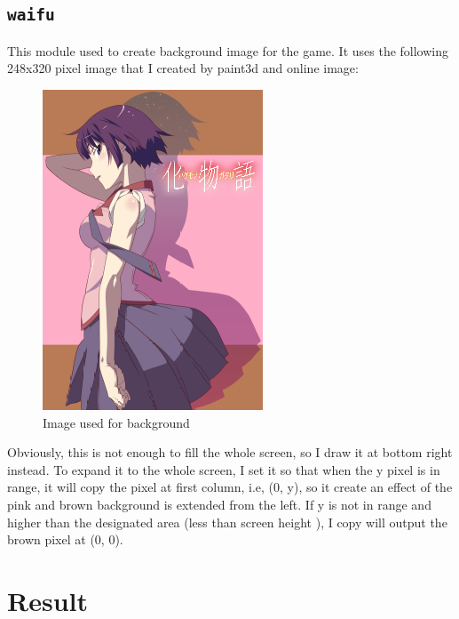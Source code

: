 \documentclass[scale = 0.9]{article}
\let\oldsection\section
\renewcommand\section{\clearpage\oldsection}
\newcommand{\code}[1]{\colorbox{light-gray}{\texttt{#1}}} %
\begin{document}
\subsection{\code{waifu}}
This module used to create background image for the game. It uses the following 248x320 pixel
image that I created by paint3d and online image:
\begin{figure}[H]
  \begin{center}
    \includegraphics{waifu2.png}
    \caption{Image used for background}\label{waifu}
  \end{center}
\end{figure}
Obviously, this is not enough to fill the whole screen, so I draw it at bottom right instead.
To expand it to the whole screen, I set it so that when the y pixel is in range, it will copy
the pixel at first column, i.e, (0, y), so it create an effect of the pink and brown background
is extended from the left. If y is not in range and higher than the designated area (less than
screen height ), I copy will output the brown pixel at (0, 0).


\section{Result}
\end{document}
